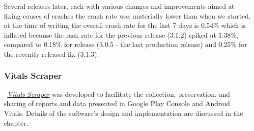 Several releases later, each with various changes and improvements aimed at fixing causes of crashes the crash rate was materially lower than when we started, at the time of writing the overall crash rate for the last 7 days is 0.54\% which is inflated because the rash rate for the previous release (3.1.2) spiked at 1.38\%, compared to 0.18\% for release (3.0.5 -  the last production release) and 0.25\% for the recently released fix (3.1.3).

\subsubsection{Vitals Scraper}
~\href{section-vitals-scraper}{\emph{Vitals Scraper}} was developed to facilitate the collection, preservation, and sharing of reports and data presented in Google Play Console and Android Vitals. Details of the software's design and implementation are discussed in the~\href{chapter-code-needed}{} chapter.

